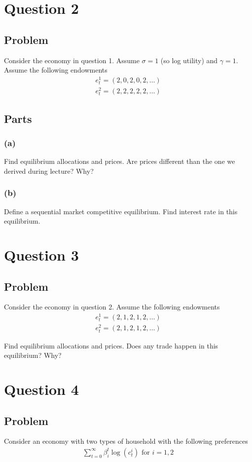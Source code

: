 \documentclass[10pt, a4paper]{article}
\begin{document}
\section*{Question 2}
\subsection*{Problem}
Consider the economy in question 1. Assume $\sigma = 1$ (so log utility) and $\gamma = 1$. Assume the following endowments
\begin{gather*}
  e^1_t = (2,0,2,0,2,\ldots)\\
  e^2_t = (2,2,2,2,2,\ldots)
\end{gather*}

\subsection*{Parts}
\subsubsection*{(a)}
Find equilibrium allocations and prices. Are prices different than the one we derived during lecture? Why?

\subsubsection*{(b)}
Define a sequential market competitive equilibrium. Find interest rate in this equilibrium.

\section*{Question 3}
\subsection*{Problem}
Consider the economy in question 2. Assume the following endowments
\begin{gather*}
  e^1_t = (2,1,2,1,2,\ldots)\\
  e^2_t = (2,1,2,1,2,\ldots)
\end{gather*}

Find equilibrium allocations and prices. Does any trade happen in this equilibrium? Why?

\section*{Question 4}
\subsection*{Problem}
Consider an economy with two types of household with the following preferences
\begin{gather*}
  \sum_{t=0}^{\infty} \beta_i^t \log(c^i_t) \text{ for } i = 1,2
\end{gather*}
\end{document}
